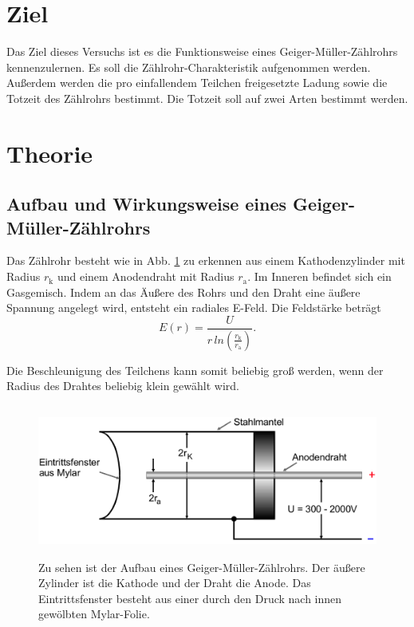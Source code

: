 \section{Ziel}
Das Ziel dieses Versuchs ist es die Funktionsweise eines Geiger-Müller-Zählrohrs kennenzulernen. Es soll die Zählrohr-Charakteristik aufgenommen werden.
Außerdem werden die pro einfallendem Teilchen freigesetzte Ladung sowie die Totzeit des Zählrohrs bestimmt. Die Totzeit soll auf zwei Arten bestimmt werden.

\section{Theorie}
\label{sec:Theorie}

\subsection{Aufbau und Wirkungsweise eines Geiger-Müller-Zählrohrs}

Das Zählrohr besteht wie in Abb. \ref{fig:zaehlrohr} zu erkennen aus einem Kathodenzylinder mit Radius $r_\text{k}$ und einem Anodendraht mit Radius $r_\text{a}$. Im Inneren befindet sich ein Gasgemisch. Indem an das Äußere des Rohrs und den Draht eine äußere Spannung angelegt wird, entsteht ein radiales E-Feld. Die Feldstärke beträgt 
\begin{equation*}
    E(r) = \frac{U}{r \, ln \left(\frac{r_\text{k}}{r_\text{a}} \right)}.
    \label{eqn:feldstärke}
\end{equation*}

\noindent Die Beschleunigung des Teilchens kann somit beliebig groß werden, wenn der Radius des Drahtes beliebig klein gewählt wird. %

\begin{figure}
    \centering
    \includegraphics[width=12cm, height=5cm]{build/zaehlrohr.png}
    \caption{Zu sehen ist der Aufbau eines Geiger-Müller-Zählrohrs. Der äußere Zylinder ist die Kathode und der Draht die Anode. Das Eintrittsfenster besteht aus einer durch den Druck nach innen gewölbten Mylar-Folie. \cite{V703}}
    \label{fig:zaehlrohr}
\end{figure}

